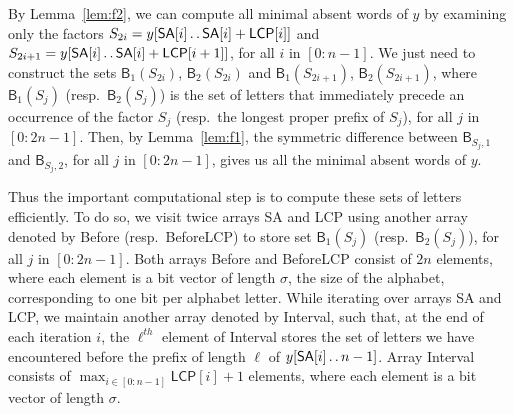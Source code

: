\documentclass{llncs}
\def\dd{\mathinner{.\,.}}
\newcommand{\SA}{\textsf{SA}}
\newcommand{\LCP}{\textsf{LCP}}
\newcommand{\Before}{\textsf{Before}}
\newcommand{\BeforeLCP}{\textsf{BeforeLCP}}
\newcommand{\Interval}{\textsf{Interval}}
\begin{document}
By Lemma~\ref{lem:f2}, we can compute all minimal absent words of $y$ by examining only the factors $S_{2i}=y[\SA{}[i]\dd \SA{}[i]+\LCP{}[i]]$ and $S_{2i+1}=y[\SA{}[i]\dd \SA{}[i]+\LCP{}[i+1]]$, for all $i$ in $[0:n-1]$. 
  We just need to construct the sets $\textsf{B}_{1}(S_{2i})$, $\textsf{B}_{2}(S_{2i})$ and $\textsf{B}_{1}(S_{2i+1})$, $\textsf{B}_{2}(S_{2i+1})$, where $\textsf{B}_{1}(S_{j})$ (resp.~$\textsf{B}_{2}(S_{j})$) is the set of letters that immediately precede an occurrence of the factor $S_j$ (resp.~the longest proper prefix of $S_j$), for all $j$ in $[0:2n-1]$.
  Then, by Lemma~\ref{lem:f1}, the symmetric difference between $\textsf{B}_{S_{j},1}$ and $\textsf{B}_{S_{j},2}$, for all $j$ in $[0:2n-1]$, gives us all the minimal absent words of $y$.

  Thus the important computational step is to compute these sets of letters efficiently. 
  To do so, we visit twice arrays \SA{} and \LCP{} using another array denoted by \Before{} (resp.~\BeforeLCP{}) to store set $\textsf{B}_{1}(S_j)$ (resp.~$\textsf{B}_{2}(S_j)$), for all $j$ in $[0:2n-1]$. 
  Both arrays \Before{} and \BeforeLCP{} consist of $2n$ elements, where each element is a bit vector of length $\sigma$, the size of the alphabet, corresponding to one bit per alphabet letter.
  While iterating over arrays \SA{} and \LCP{}, we maintain another array denoted by \Interval{}, such that, at the end of each iteration $i$, the $\ell^{th}$ element of \Interval{} stores the set of letters we have encountered before the prefix of length $\ell$ of $y[\SA{}[i]\dd n-1]$. 
  Array \Interval{} consists of ${\displaystyle\max_{ i \in [0:n-1] }}\LCP{}[i]+1$ elements, where each element is a bit vector of length $\sigma$.
\end{document}
